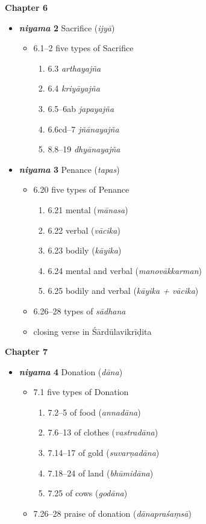 \documentclass[11pt]{book} %
\newcommand{\skt}[1]{\textit{#1}}
\begin{document}
 \textbf{Chapter 6}
\begin{itemize}
\item \textbf{\skt{niyama} 2}  Sacrifice (\skt{ijyā})
  \begin{itemize}
  \item 6.1--2 five types of Sacrifice
  \begin{enumerate}
  \item 6.3 \skt{arthayajña}
   \item 6.4 \skt{kriyāyajña}
   \item 6.5--6ab \skt{japayajña}
   \item 6.6cd--7 \skt{jñānayajña}
   \item 8.8--19 \skt{dhyānayajña}
  \end{enumerate}
\end{itemize}
  
\item \textbf{\skt{niyama} 3} Penance (\skt{tapas})
  \begin{itemize}
    \item 6.20 five types of Penance
      \begin{enumerate}
\item 6.21 mental (\skt{mānasa})
\item 6.22 verbal (\skt{vācika})
\item 6.23 bodily (\skt{kāyika})
\item 6.24 mental and verbal (\skt{manovākkarman}) 
\item 6.25 bodily and verbal (\skt{kāyika + vācika})
  \end{enumerate}
  \item 6.26--28 types of \skt{sādhana}
  \item closing verse in Śārdūlavikrīḍita
    \end{itemize}
\end{itemize}



 \textbf{Chapter 7}
  \begin{itemize}
\item \textbf{\skt{niyama} 4}  Donation (\skt{dāna})
  \begin{itemize}
\item 7.1 five types of Donation
  \begin{enumerate}
\item 7.2--5 of food (\skt{annadāna})
\item 7.6--13 of clothes (\skt{vastradāna})
\item 7.14--17 of gold (\skt{suvarṇadāna})
\item 7.18--24 of land (\skt{bhūmidāna})
\item 7.25 of cows (\skt{godāna})

  \end{enumerate}
\item 7.26--28 praise of donation (\skt{dānapraśaṃsā})
  \end{itemize}
  \end{itemize}
\end{document}
